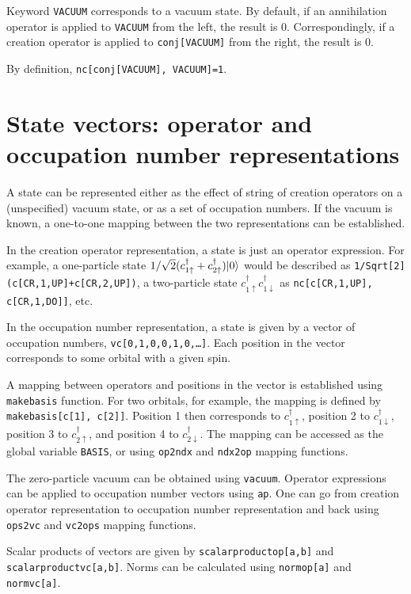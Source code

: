 \documentclass[a4paper,10pt,openany]{book}
\begin{document}
Keyword {\tt VACUUM} corresponds to a vacuum state. By default, if an
annihilation operator is applied to {\tt VACUUM} from the left, the
result is 0. Correspondingly, if a creation operator is applied to
{\tt conj[VACUUM]} from the right, the result is 0.

By definition, {\tt nc[conj[VACUUM], VACUUM]=1}.


\section{State vectors: operator and occupation number representations}

A state can be represented either as the effect of string of creation
operators on a (unspecified) vacuum state, or as a set of occupation
numbers. If the vacuum is known, a one-to-one mapping between the two
representations can be established.

In the creation operator representation, a state is just an operator
expression. For example, a one-particle state $1/\sqrt{2}
(c^\dag_{1\uparrow} + c^\dag_{2\uparrow}) | 0 \rangle$ would be described as
{\tt 1/Sqrt[2] (c[CR,1,UP]+c[CR,2,UP])}, a two-particle state
$c^\dag_{1\uparrow} c^\dag_{1\downarrow}$ as {\tt nc[c[CR,1,UP],
c[CR,1,DO]]}, etc.

In the occupation number representation, a state is given by a vector of
occupation numbers, {\tt vc[0,1,0,0,1,0,\dots]}. Each position in the vector
corresponds to some orbital with a given spin. 

A mapping between operators and positions in the vector is established using
{\tt makebasis} function. For two orbitals, for example, the mapping is
defined by {\tt makebasis[c[1], c[2]]}. Position 1 then corresponds to
$c^\dag_{1\uparrow}$, position 2 to $c^\dag_{1\downarrow}$, position 3 to
$c^\dag_{2\uparrow}$, and position 4 to $c^\dag_{2\downarrow}$. The mapping
can be accessed as the global variable {\tt BASIS}, or using {\tt op2ndx}
and {\tt ndx2op} mapping functions. 

The zero-particle vacuum can be obtained using {\tt vacuum}. Operator
expressions can be applied to occupation number vectors using {\tt ap}. One
can go from creation operator representation to occupation number
representation and back using {\tt ops2vc} and {\tt vc2ops} mapping
functions.

Scalar products of vectors are given by {\tt scalarproductop[a,b]} and {\tt
scalarproductvc[a,b]}. Norms can be calculated using {\tt normop[a]} and
{\tt normvc[a]}.
\end{document}
